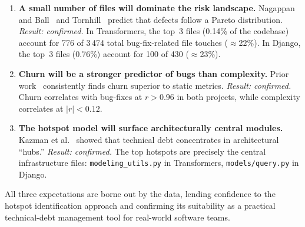 \documentclass[12pt,a4paper]{article}
\begin{document}
\begin{enumerate}[leftmargin=2em]
  \item \textbf{A small number of files will dominate the risk landscape.}
        Nagappan and Ball~\cite{nagappan2005} and Tornhill~\cite{tornhill2015} predict that defects follow a Pareto distribution.
        \emph{Result: confirmed.}
        In Transformers, the top~3 files (0.14\% of the codebase) account for 776 of 3\,474 total bug-fix-related file touches ($\approx$22\%).
        In Django, the top~3 files (0.76\%) account for 100 of 430 ($\approx$23\%).

  \item \textbf{Churn will be a stronger predictor of bugs than complexity.}
        Prior work~\cite{nagappan2005,hassan2009} consistently finds churn superior to static metrics.
        \emph{Result: confirmed.}
        Churn correlates with bug-fixes at $r > 0.96$ in both projects, while complexity correlates at $|r| < 0.12$.

  \item \textbf{The hotspot model will surface architecturally central modules.}
        Kazman et al.~\cite{kazman2015} showed that technical debt concentrates in architectural ``hubs.''
        \emph{Result: confirmed.}
        The top hotspots are precisely the central infrastructure files: \texttt{modeling\_utils.py} in Transformers, \texttt{models/query.py} in Django.
\end{enumerate}

All three expectations are borne out by the data, lending confidence to the hotspot identification approach and confirming its suitability as a practical technical-debt management tool for real-world software teams.
\end{document}
